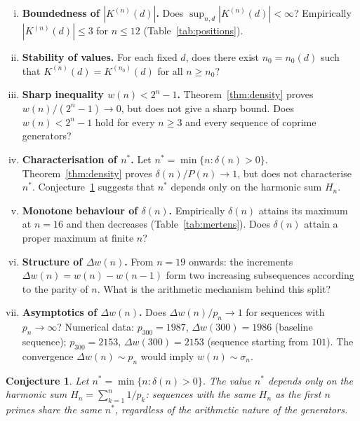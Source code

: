\documentclass[11pt,a4paper]{amsart}
\theoremstyle{plain}
\newtheorem{conjecture}[theorem]{Conjecture}
\theoremstyle{definition}
\theoremstyle{remark}
\begin{document}
\begin{enumerate}[(i)]

\item \textbf{Boundedness of $|K^{(n)}(d)|$.}
Does $\sup_{n,d} |K^{(n)}(d)| < \infty$?
Empirically $|K^{(n)}(d)| \leq 3$ for $n \leq 12$
(Table~\ref{tab:positions}).

\item \textbf{Stability of values.}
For each fixed $d$, does there exist $n_0 = n_0(d)$ such that
$K^{(n)}(d) = K^{(n_0)}(d)$ for all $n \geq n_0$?

\item \textbf{Sharp inequality $w(n) < 2^n - 1$.}
Theorem~\ref{thm:density} proves $w(n)/(2^n-1) \to 0$,
but does not give a sharp bound.
Does $w(n) < 2^n - 1$ hold for every $n \geq 3$
and every sequence of coprime generators?

\item \textbf{Characterisation of $n^*$.}
Let $n^* = \min\{n : \delta(n) > 0\}$.
Theorem~\ref{thm:density} proves $\delta(n)/P(n) \to 1$,
but does not characterise $n^*$.
Conjecture~\ref{conj:harmonic} suggests that $n^*$ depends only
on the harmonic sum $H_n$.

\item \textbf{Monotone behaviour of $\delta(n)$.}
Empirically $\delta(n)$ attains its maximum at $n = 16$
and then decreases (Table~\ref{tab:mertens}).
Does $\delta(n)$ attain a proper maximum at finite $n$?

\item \textbf{Structure of $\Delta w(n)$.}
From $n = 19$ onwards: the increments $\Delta w(n) = w(n) - w(n-1)$
form two increasing subsequences according to the parity of $n$.
What is the arithmetic mechanism behind this split?

\item \textbf{Asymptotics of $\Delta w(n)$.}
Does $\Delta w(n) / p_n \to 1$ for sequences with $p_n \to \infty$?
Numerical data: $p_{300} = 1987$, $\Delta w(300) = 1986$
(baseline sequence); $p_{300} = 2153$, $\Delta w(300) = 2153$
(sequence starting from $101$). The convergence $\Delta w(n) \sim p_n$
would imply $w(n) \sim \sigma_n$.

\end{enumerate}

\begin{conjecture}
\label{conj:harmonic}
Let $n^* = \min\{n : \delta(n) > 0\}$.
The value $n^*$ depends only on the harmonic sum
$H_n = \sum_{k=1}^n 1/p_k$: sequences with the same $H_n$
as the first $n$ primes share the same $n^*$,
regardless of the arithmetic nature of the generators.
\end{conjecture}
\end{document}
